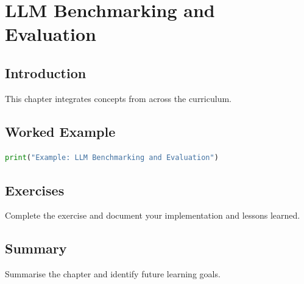 \chapter{LLM Benchmarking and Evaluation}
\label{chap:vol11-8}



\section{Introduction}
This chapter integrates concepts from across the curriculum.

\section{Worked Example}
\begin{lstlisting}[language=Python]
print("Example: LLM Benchmarking and Evaluation")
\end{lstlisting}

\section{Exercises}
\begin{exercise}
Complete the exercise and document your implementation and lessons learned.
\end{exercise}

\section{Summary}
Summarise the chapter and identify future learning goals.
